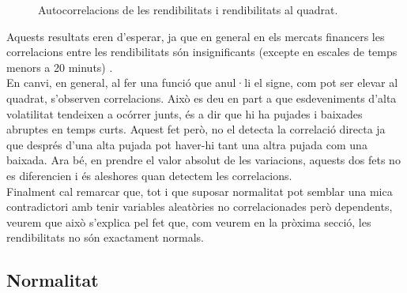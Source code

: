 \documentclass{article}
\numberwithin{table}{section}
\numberwithin{figure}{section}
\numberwithin{equation}{section}
\begin{document}
\begin{figure}[H]
  \caption{Autocorrelacions de les rendibilitats i rendibilitats al quadrat.}
\end{figure}
Aquests resultats eren d'esperar, ja que en general en els mercats financers les correlacions entre les rendibilitats són insignificants (excepte en escales de temps menors a 20 minuts) \cite{20}.\\
En canvi, en general, al fer una funció que anul·li el signe, com pot ser elevar al quadrat, s’observen correlacions. Això es deu en part a que esdeveniments d’alta volatilitat tendeixen a ocórrer junts, és a dir que hi ha pujades i baixades abruptes en temps curts. Aquest fet però, no el detecta la correlació directa ja que després d’una alta pujada pot haver-hi tant una altra pujada com una baixada. Ara bé, en prendre el valor absolut de les variacions, aquests dos fets no es diferencien i és aleshores quan detectem les correlacions.\\
Finalment cal remarcar que, tot i que suposar normalitat pot semblar una mica contradictori amb tenir variables aleatòries no correlacionades però dependents, veurem que això s’explica pel fet que, com veurem en la pròxima secció, les rendibilitats no són exactament normals.







\subsection{Normalitat}%
\end{document}
